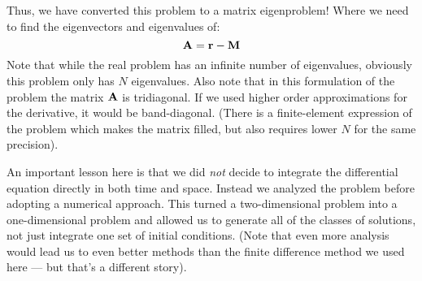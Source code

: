 Thus, we have converted this problem to a matrix eigenproblem!  Where
we need to find the eigenvectors and eigenvalues of:
\begin{equation}
{\bf A} = {\bf r} - {\bf M}
\end{equation}
Note that while the real problem has an infinite number of
eigenvalues, obviously this problem only has $N$ eigenvalues. Also
note that in this formulation of the problem the   matrix ${\bf A}$ is
tridiagonal. If we used higher order approximations for the
derivative, it would be band-diagonal. (There is a finite-element
expression of the problem which makes the matrix filled, but also
requires lower $N$ for the same precision).

An important lesson here is that we did {\it not} decide to integrate
the differential equation directly in both time and space. Instead we
analyzed the problem before adopting a numerical approach. This turned
a two-dimensional problem into a one-dimensional problem and allowed
us to generate all of the classes of solutions, not just integrate
one set of initial conditions. (Note that even more analysis would
lead us to even better methods than the finite difference method we
used here --- but that's a different story).

